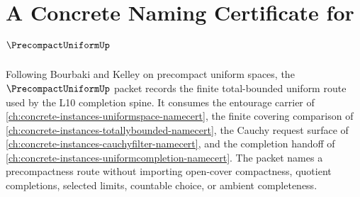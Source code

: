 \chapter{A Concrete Naming Certificate for $\PrecompactUniformUp$}
\label{ch:concrete-instances-precompact-uniform-namecert}

Following Bourbaki and Kelley on precompact uniform spaces, the $\PrecompactUniformUp$ packet records the finite total-bounded uniform route used by the L10 completion spine. It consumes the entourage carrier of \autoref{ch:concrete-instances-uniformspace-namecert}, the finite covering comparison of \autoref{ch:concrete-instances-totallybounded-namecert}, the Cauchy request surface of \autoref{ch:concrete-instances-cauchyfilter-namecert}, and the completion handoff of \autoref{ch:concrete-instances-uniformcompletion-namecert}. The packet names a precompactness route without importing open-cover compactness, quotient completions, selected limits, countable choice, or ambient completeness.

